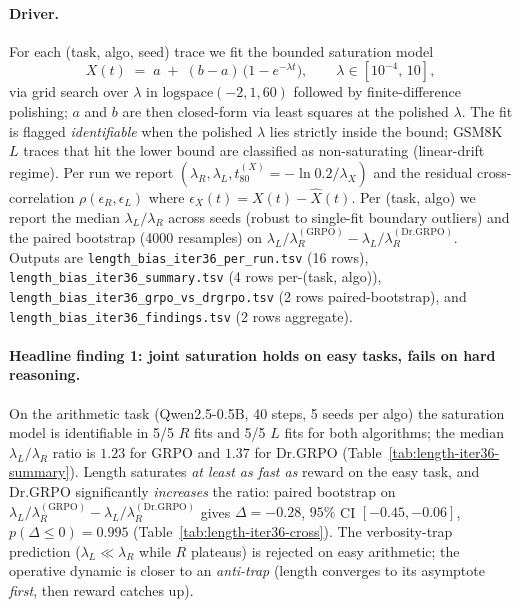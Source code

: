 \documentclass{article}
\begin{document}
\paragraph{Driver.}
For each (task, algo, seed) trace we fit the bounded
saturation model
\begin{equation}
  X(t) \;=\; a \;+\; (b - a)\,\bigl(1 - e^{-\lambda t}\bigr),
  \qquad \lambda \in [10^{-4},\, 10],
\end{equation}
via grid search over $\lambda$ in $\mathrm{logspace}(-2, 1, 60)$
followed by finite-difference polishing; $a$ and $b$ are then
closed-form via least squares at the polished $\lambda$. The fit is
flagged \emph{identifiable} when the polished $\lambda$ lies strictly
inside the bound; GSM8K $L$ traces that hit the lower bound are
classified as non-saturating (linear-drift regime). Per run we report
$(\lambda_R, \lambda_L, t_{80}^{(X)} = -\ln 0.2 / \lambda_X)$ and the
residual cross-correlation $\rho(\epsilon_R, \epsilon_L)$ where
$\epsilon_X(t) = X(t) - \hat{X}(t)$. Per (task, algo) we report the
median $\lambda_L/\lambda_R$ across seeds (robust to single-fit
boundary outliers) and the paired bootstrap (4000 resamples) on
$\lambda_L/\lambda_R^{(\mathrm{GRPO})} - \lambda_L/\lambda_R^{(\mathrm{Dr.GRPO})}$.
Outputs are \texttt{length\_bias\_iter36\_per\_run.tsv} (16 rows),
\texttt{length\_bias\_iter36\_summary.tsv} (4 rows per-(task, algo)),
\texttt{length\_bias\_iter36\_grpo\_vs\_drgrpo.tsv} (2 rows
paired-bootstrap), and \texttt{length\_bias\_iter36\_findings.tsv} (2
rows aggregate).

\paragraph{Headline finding 1: joint saturation holds on easy tasks,
fails on hard reasoning.}
On the arithmetic task (Qwen2.5-0.5B, 40 steps, 5 seeds per algo) the
saturation model is identifiable in 5/5 $R$ fits and 5/5 $L$ fits for
both algorithms; the median $\lambda_L / \lambda_R$ ratio is $1.23$
for GRPO and $1.37$ for Dr.GRPO (Table~\ref{tab:length-iter36-summary}).
Length saturates \emph{at least as fast as} reward on the easy task,
and Dr.GRPO significantly \emph{increases} the ratio: paired
bootstrap on $\lambda_L/\lambda_R^{(\mathrm{GRPO})} -
\lambda_L/\lambda_R^{(\mathrm{Dr.GRPO})}$ gives $\Delta = -0.28$,
$95\%$ CI $[-0.45, -0.06]$, $p(\Delta \leq 0) = 0.995$
(Table~\ref{tab:length-iter36-cross}). The verbosity-trap prediction
($\lambda_L \ll \lambda_R$ while $R$ plateaus) is rejected on easy
arithmetic; the operative dynamic is closer to an \emph{anti-trap}
(length converges to its asymptote \emph{first}, then reward catches
up).
\end{document}
